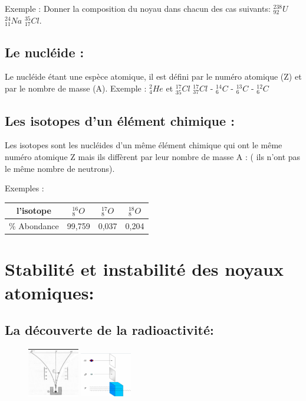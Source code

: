\documentclass[12pt]{article}
\begin{document}
Exemple : Donner la composition du noyau dans chacun des cas suivants: $_{92}^{238}U$     $_{11}^{24}Na$ $_{17}^{35}Cl$.

\subsection{Le nucléide : }

Le nucléide étant une espèce atomique, il est défini par le numéro atomique (Z) et par le nombre de masse (A).
Exemple : $_4^2He$ et $_{35}^{17}Cl$ $_{37}^{17}Cl$ - $_{6}^{14}C$ - $_{6}^{13}C$ - $_{6}^{12}C$
\subsection{Les isotopes d’un élément chimique : }

Les isotopes sont les nucléides d'un même élément chimique qui ont le même numéro atomique Z mais
ils diffèrent par leur nombre de masse A : ( ils n'ont pas le même nombre de neutrons). 

Exemples : 
\begin{center}
   \begin{tabular}{ |c|c|c|c| }
	  \hline
	  l'isotope & $_{8}^{16}O$ & $_{8}^{17}O$ & $_{8}^{18}O$ \\\hline
	  \% Abondance & 99,759 & 0,037 & 0,204\\\hline
  \end{tabular}\end{center}


  \section{Stabilité et instabilité des noyaux atomiques: }
  \subsection{La découverte de la radioactivité:}


  \begin{figure}
	\vspace{-2cm}
	\includegraphics[width=0.2\textwidth]{./img/nuc01.png}
	\includegraphics[width=0.2\textwidth]{./img/nuc02.png}
\end{figure}
\end{document}

